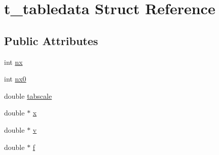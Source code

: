 \hypertarget{structt__tabledata}{\section{t\-\_\-tabledata \-Struct \-Reference}
\label{structt__tabledata}
}
\subsection*{\-Public \-Attributes}
\begin{DoxyCompactItemize}
\item 
int \hyperlink{structt__tabledata_a54edeae7108f8abe0606b3a75801b397}{nx}
\item 
int \hyperlink{structt__tabledata_a9b7902088bba50a45c29c6884a922ce9}{nx0}
\item 
double \hyperlink{structt__tabledata_a56a70c28227d3d613d1afc1d578d4587}{tabscale}
\item 
double $\ast$ \hyperlink{structt__tabledata_a32159029ce69a016b4f44d13804e3992}{x}
\item 
double $\ast$ \hyperlink{structt__tabledata_ad683356b56bfda6156542f4ad41fa234}{v}
\item 
double $\ast$ \hyperlink{structt__tabledata_afccea3bd04225c5759193b339ff28b93}{f}
\end{DoxyCompactItemize}


